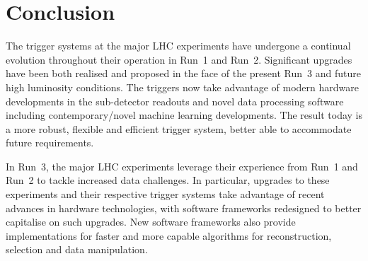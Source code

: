 \section{Conclusion}

The trigger systems at the major LHC experiments have undergone a continual evolution throughout their operation in Run~1 and Run~2. Significant upgrades have been both realised and proposed in the face of the present Run~3 and future high luminosity conditions. The triggers now take advantage of modern hardware developments in the sub-detector readouts and novel data processing software including contemporary/novel machine learning developments. The result today is a more robust, flexible and efficient trigger system, better able to accommodate future requirements.

In Run~3, the major LHC experiments leverage their experience from Run~1 and Run~2 to tackle increased data challenges. In particular, upgrades to these experiments and their respective trigger systems take advantage of recent advances in hardware technologies, with software frameworks redesigned to better capitalise on such upgrades. New software frameworks also provide implementations for faster and more capable algorithms for reconstruction, selection and data manipulation.

